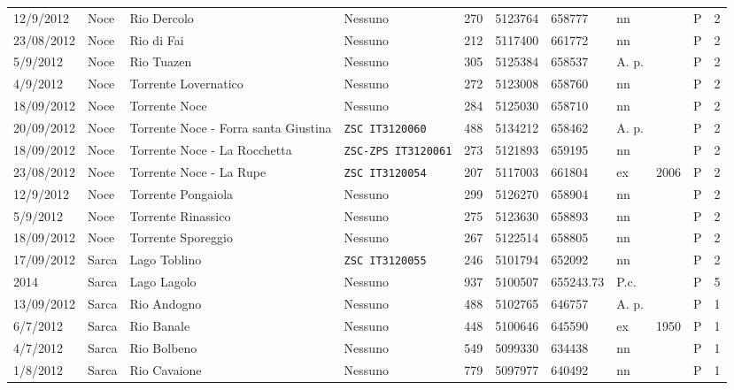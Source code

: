 \documentclass[11pt,a4paper,italian,twoside,openany]{memoir}
\begin{document}
\begin{longtable}[c]{p{}p{}p{}p{}p{}p{}p{}p{}p{}p{}l}
\rowcolor[HTML]{EFEFEF} 12/9/2012 & Noce & Rio Dercolo & Nessuno & 270 & 5123764  & 658777 & nn   &   & P & 2   \\
23/08/2012 & Noce & Rio di Fai & Nessuno & 212 & 5117400  & 661772 & nn   &   & P & 2   \\
\rowcolor[HTML]{EFEFEF} 5/9/2012  & Noce & Rio Tuazen & Nessuno & 305 & 5125384  & 658537 & A. p.  &   & P & 2   \\
4/9/2012  & Noce & Torrente Lovernatico  & Nessuno & 272 & 5123008  & 658760 & nn   &   & P & 2   \\
\rowcolor[HTML]{EFEFEF} 18/09/2012 & Noce & Torrente Noce  & Nessuno & 284 & 5125030  & 658710 & nn   &   & P & 2   \\
20/09/2012 & Noce & Torrente Noce - Forra santa Giustina & \texttt{ZSC IT3120060}  & 488 & 5134212  & 658462 & A. p.  &   & P & 2   \\
\rowcolor[HTML]{EFEFEF} 18/09/2012 & Noce & Torrente Noce - La Rocchetta   & \texttt{ZSC-ZPS IT3120061}   & 273 & 5121893  & 659195 & nn   &   & P & 2   \\
23/08/2012 & Noce & Torrente Noce - La Rupe   & \texttt{ZSC IT3120054}  & 207 & 5117003  & 661804 & ex   & 2006  & P & 2   \\
\rowcolor[HTML]{EFEFEF} 12/9/2012 & Noce & Torrente Pongaiola & Nessuno & 299 & 5126270  & 658904 & nn   &   & P & 2   \\
5/9/2012  & Noce & Torrente Rinassico & Nessuno & 275 & 5123630  & 658893 & nn   &   & P & 2   \\
\rowcolor[HTML]{EFEFEF} 18/09/2012 & Noce & Torrente Sporeggio & Nessuno & 267 & 5122514  & 658805 & nn   &   & P & 2   \\
17/09/2012 & Sarca  & Lago Toblino   & \texttt{ZSC IT3120055}  & 246 & 5101794  & 652092 & nn   &   & P & 2   \\
\rowcolor[HTML]{EFEFEF} 2014  & Sarca  & Lago Lagolo & Nessuno & 937 & 5100507  & 655243.73 & P.c. &   & P & 5   \\
13/09/2012 & Sarca  & Rio Andogno & Nessuno & 488 & 5102765  & 646757 & A. p.  &   & P & 1   \\
\rowcolor[HTML]{EFEFEF} 6/7/2012  & Sarca  & Rio Banale & Nessuno & 448 & 5100646  & 645590 & ex   & 1950  & P & 1   \\
4/7/2012  & Sarca  & Rio Bolbeno & Nessuno & 549 & 5099330  & 634438 & nn   &   & P & 1   \\
\rowcolor[HTML]{EFEFEF} 1/8/2012  & Sarca  & Rio Cavaione   & Nessuno & 779 & 5097977  & 640492 & nn   &   & P & 1   \\

\end{longtable}
\end{document}
